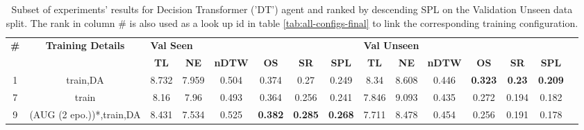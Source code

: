 \begin{table}
\centering
\caption{\label{tab:dt_final}Subset of experiments' results for Decision Transformer ('DT') agent and ranked by descending SPL on the Validation Unseen data split. The rank in column \# is also used as a look up id in table \ref{tab:all-configs-final} to link the corresponding training configuration.}
\begin{tabular}{@{\hskip3pt}c@{\hskip3pt}c@{\hskip3pt}c@{\hskip3pt}c@{\hskip3pt}c@{\hskip3pt}c@{\hskip3pt}c@{\hskip3pt}c@{\hskip3pt}c@{\hskip3pt}c@{\hskip3pt}c@{\hskip3pt}c@{\hskip3pt}c@{\hskip3pt}c@{\hskip3pt}c}
\toprule
\textbf{\#} & \textbf{Training Details} & \multicolumn{6}{l}{\textbf{Val Seen}} & \multicolumn{6}{l}{\textbf{Val Unseen}} \\
 \textbf{~} &                \textbf{~} &       \textbf{TL} & \textbf{NE} & \textbf{nDTW} &     \textbf{OS} &     \textbf{SR} &    \textbf{SPL} &         \textbf{TL} & \textbf{NE} & \textbf{nDTW} &     \textbf{OS} &    \textbf{SR} &    \textbf{SPL} \\
\midrule
          1 &                  train,DA &             8.732 &       7.959 &         0.504 &           0.374 &            0.27 &           0.249 &                8.34 &       8.608 &         0.446 &  \textbf{0.323} &  \textbf{0.23} &  \textbf{0.209} \\
          7 &                     train &              8.16 &        7.96 &         0.493 &           0.364 &           0.256 &           0.241 &               7.846 &       9.093 &         0.435 &           0.272 &          0.194 &           0.182 \\
          9 &  (AUG (2 epo.))*,train,DA &             8.431 &       7.534 &         0.525 &  \textbf{0.382} &  \textbf{0.285} &  \textbf{0.268} &               7.711 &       8.478 &         0.454 &           0.256 &          0.191 &           0.178 \\
\bottomrule
\end{tabular}
\end{table}
